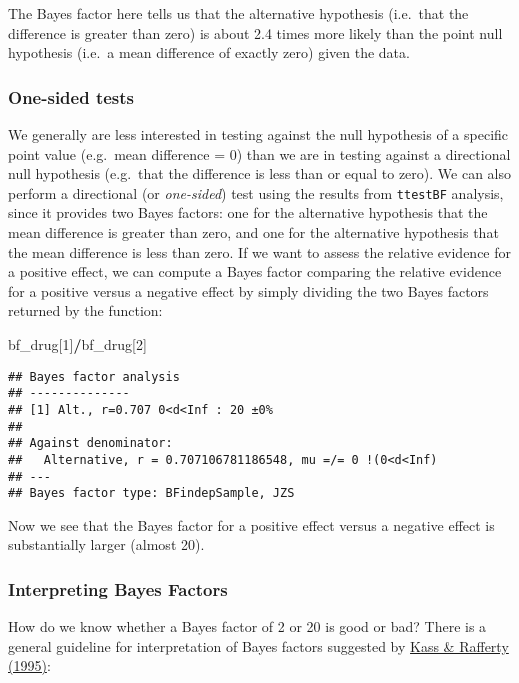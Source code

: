 \documentclass[]{book}
\newenvironment{Shaded}{\begin{snugshade}}{\end{snugshade}}
\newcommand{\DecValTok}[1]{\textcolor[rgb]{0.00,0.00,0.81}{#1}}
\newcommand{\OperatorTok}[1]{\textcolor[rgb]{0.81,0.36,0.00}{\textbf{#1}}}
\newcommand{\NormalTok}[1]{#1}
\theoremstyle{definition}
\theoremstyle{definition}
\theoremstyle{definition}
\theoremstyle{remark}
\begin{document}
The Bayes factor here tells us that the alternative hypothesis
(i.e.~that the difference is greater than zero) is about 2.4 times more
likely than the point null hypothesis (i.e.~a mean difference of exactly
zero) given the data.

\subsubsection{One-sided tests}\label{one-sided-tests}

We generally are less interested in testing against the null hypothesis
of a specific point value (e.g.~mean difference = 0) than we are in
testing against a directional null hypothesis (e.g.~that the difference
is less than or equal to zero). We can also perform a directional (or
\emph{one-sided}) test using the results from \texttt{ttestBF} analysis,
since it provides two Bayes factors: one for the alternative hypothesis
that the mean difference is greater than zero, and one for the
alternative hypothesis that the mean difference is less than zero. If we
want to assess the relative evidence for a positive effect, we can
compute a Bayes factor comparing the relative evidence for a positive
versus a negative effect by simply dividing the two Bayes factors
returned by the function:

\begin{Shaded}
\begin{Highlighting}[]
\NormalTok{bf_drug[}\DecValTok{1}\NormalTok{]}\OperatorTok{/}\NormalTok{bf_drug[}\DecValTok{2}\NormalTok{]}
\end{Highlighting}
\end{Shaded}

\begin{verbatim}
## Bayes factor analysis
## --------------
## [1] Alt., r=0.707 0<d<Inf : 20 ±0%
## 
## Against denominator:
##   Alternative, r = 0.707106781186548, mu =/= 0 !(0<d<Inf) 
## ---
## Bayes factor type: BFindepSample, JZS
\end{verbatim}

Now we see that the Bayes factor for a positive effect versus a negative
effect is substantially larger (almost 20).

\subsubsection{Interpreting Bayes
Factors}\label{interpreting-bayes-factors}

How do we know whether a Bayes factor of 2 or 20 is good or bad? There
is a general guideline for interpretation of Bayes factors suggested by
\href{https://www.andrew.cmu.edu/user/kk3n/simplicity/KassRaftery1995.pdf}{Kass
\& Rafferty (1995)}:
\end{document}
